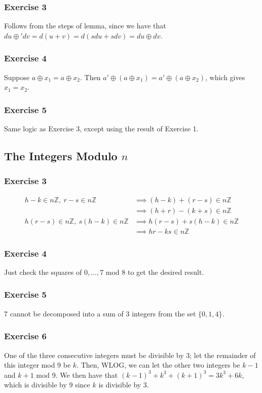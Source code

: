 \subsubsection{Exercise 3}
Follows from the steps of lemma, since we have that $du \oplus' dv = d(u + v) = d(sdu + sdv) = du \oplus dv$.

\subsubsection{Exercise 4}
Suppose $a \oplus x_1 = a \oplus x_2$. Then $a' \oplus (a \oplus x_1) = a' \oplus (a \oplus x_2)$,
which gives $x_1 = x_2$.

\subsubsection{Exercise 5}
Same logic as Exercise 3, except using the result of Exercise 1.

\subsection{The Integers Modulo $n$}

\subsubsection{Exercise 3}
\begin{align*}
        h - k \in n\mathbb{Z},\:  r - s \in n\mathbb{Z} &\implies (h - k) + (r - s) \in n\mathbb{Z} \\
                                                     &\implies (h + r) - (k + s) \in n\mathbb{Z} \\
        h (r - s) \in n\mathbb{Z},\: s (h - k) \in n\mathbb{Z} &\implies h (r - s) + s (h - k) \in n\mathbb{Z} \\
                                                               &\implies hr - ks \in n\mathbb{Z}
\end{align*}

\subsubsection{Exercise 4}
Just check the squares of $0, ..., 7$ mod 8 to get the desired result.

\subsubsection{Exercise 5}
7 cannot be decomposed into a sum of 3 integers from the set $\{0, 1, 4\}$.

\subsubsection{Exercise 6}
One of the three consecutive integers must be divisible by 3; let the remainder of this integer mod 9 be
$k$. Then, WLOG, we can let the other two integers be $k - 1$ and $k + 1$ mod 9. We then have that
$(k - 1)^3 + k^3 + (k + 1)^3 = 3k^3 + 6k$, which is divisible by 9 since $k$ is divisible by 3.
